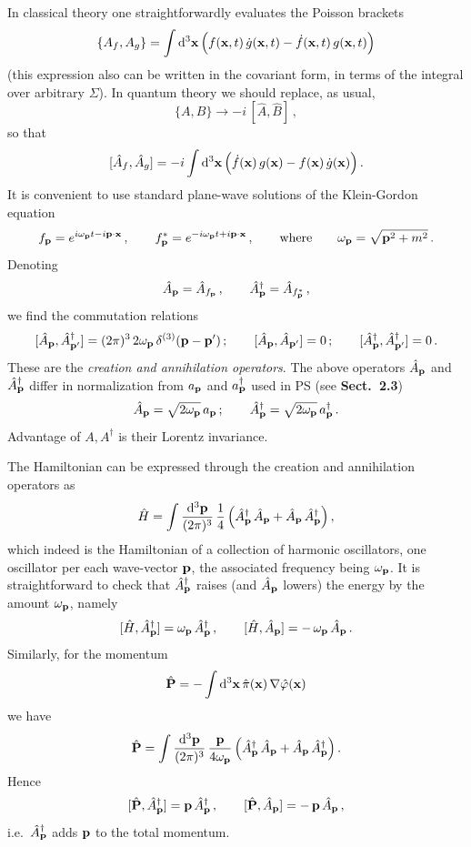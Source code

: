 In classical theory one straightforwardly evaluates the Poisson brackets
\[
\{A_f,A_g\}=\int \mathop{}\!\mathrm{d}^3\mathbf{x}\,\Bigl(f(\mathbf{x},t)\,\dot g(\mathbf{x},t)-\dot f(\mathbf{x},t)\,g(\mathbf{x},t)\Bigr)
\]
(this expression also can be written in the covariant form, in terms of the
integral over arbitrary $\Sigma$). In quantum theory we should replace, as
usual,
\[
\{A,B\}\to-i\,[\hat A,\hat B]\,,
\]
so that
\[
[\hat A_f,\hat A_g]=-i\int \mathop{}\!\mathrm{d}^3\mathbf{x}\,\Bigl(\dot f(\mathbf{x})\,g(\mathbf{x})-f(\mathbf{x})\,\dot g(\mathbf{x})\Bigr)\,.
\]
It is convenient to use standard plane-wave solutions of the Klein-Gordon
equation
\[
f_{\mathbf{p}}=e^{i\omega_{\mathbf{p}} t-i\mathbf{p}\cdot\mathbf{x}}\,,\qquad f^*_{\mathbf{p}}=e^{-i\omega_{\mathbf{p}} t+i\mathbf{p}\cdot\mathbf{x}}\,,
\qquad\text{where}\qquad \omega_{\mathbf{p}}=\sqrt{\mathbf{p}^2+m^2}\,.
\]
Denoting
\[
\hat A_{\mathbf{p}}=\hat A_{f_{\mathbf{p}}}\,,\qquad \hat A^\dagger_{\mathbf{p}}=\hat A_{f^*_{\mathbf{p}}}\,,
\]
we find the commutation relations
\[
[\hat A_{\mathbf{p}},\hat A^\dagger_{\mathbf{p}'}]=(2\pi)^3\,2\omega_{\mathbf{p}}\,\delta^{(3)}(\mathbf{p}-\mathbf{p}')\,;\qquad
[\hat A_{\mathbf{p}},\hat A_{\mathbf{p}'}]=0\,;\qquad
[\hat A^\dagger_{\mathbf{p}},\hat A^\dagger_{\mathbf{p}'}]=0\,.
\]
These are the \emph{creation and annihilation operators}. The above operators
$\hat A_{\mathbf{p}}$ and $\hat A^\dagger_{\mathbf{p}}$ differ in normalization from $a_{\mathbf{p}}$ and
$a^\dagger_{\mathbf{p}}$ used in PS (see \textbf{Sect.~2.3})
\[
\hat A_{\mathbf{p}}=\sqrt{2\omega_{\mathbf{p}}}\,a_{\mathbf{p}}\,;\qquad \hat A^\dagger_{\mathbf{p}}=\sqrt{2\omega_{\mathbf{p}}}\,a^\dagger_{\mathbf{p}}\,.
\]
Advantage of $A,A^\dagger$ is their Lorentz invariance.

The Hamiltonian can be expressed through the creation and annihilation
operators as
\begin{equation}\label{eq:HAA}
\hat H=\int\frac{\mathop{}\!\mathrm{d}^3\mathbf{p}}{(2\pi)^3}\,\frac14\,\Bigl(\hat A^\dagger_{\mathbf{p}}\,\hat A_{\mathbf{p}}+\hat A_{\mathbf{p}}\,\hat A^\dagger_{\mathbf{p}}\Bigr)\,,
\end{equation}
which indeed is the Hamiltonian of a collection of harmonic oscillators, one
oscillator per each wave-vector $\mathbf{p}$, the associated frequency being
$\omega_{\mathbf{p}}$. It is straightforward to check that $\hat A^\dagger_{\mathbf{p}}$ raises
(and $\hat A_{\mathbf{p}}$ lowers) the energy by the amount $\omega_{\mathbf{p}}$, namely
\[
[\hat H,\hat A^\dagger_{\mathbf{p}}]=\omega_{\mathbf{p}}\,\hat A^\dagger_{\mathbf{p}}\,,\qquad
[\hat H,\hat A_{\mathbf{p}}]=-\,\omega_{\mathbf{p}}\,\hat A_{\mathbf{p}}\,.
\]
Similarly, for the momentum
\[
\hat{\mathbf{P}}=-\int \mathop{}\!\mathrm{d}^3\mathbf{x}\,\hat\pi(\mathbf{x})\,\nabla\hat\varphi(\mathbf{x})
\]
we have
\[
\hat{\mathbf{P}}=\int\frac{\mathop{}\!\mathrm{d}^3\mathbf{p}}{(2\pi)^3}\,\frac{\mathbf{p}}{4\omega_{\mathbf{p}}}\,\Bigl(\hat A^\dagger_{\mathbf{p}}\,\hat A_{\mathbf{p}}+\hat A_{\mathbf{p}}\,\hat A^\dagger_{\mathbf{p}}\Bigr)\,.
\]
Hence
\[
[\hat{\mathbf{P}},\hat A^\dagger_{\mathbf{p}}]=\mathbf{p}\,\hat A^\dagger_{\mathbf{p}}\,,\qquad
[\hat{\mathbf{P}},\hat A_{\mathbf{p}}]=-\,\mathbf{p}\,\hat A_{\mathbf{p}}\,,
\]
i.e.\ $\hat A^\dagger_{\mathbf{p}}$ adds $\mathbf{p}$ to the total momentum.

